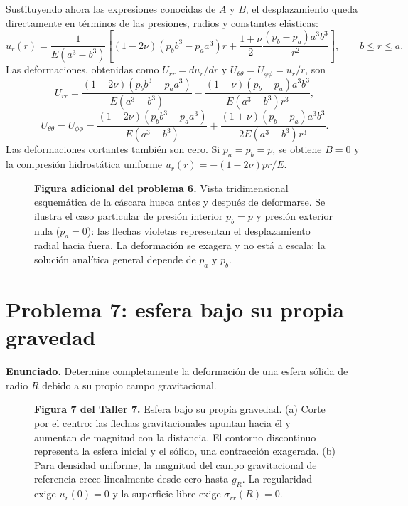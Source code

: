 \documentclass[a4paper]{article}
\begin{document}
Sustituyendo ahora las expresiones conocidas de $A$ y $B$, el desplazamiento queda directamente en términos de las presiones, radios y constantes elásticas:
\[
\boxed{
u_r(r)=\frac{1}{E(a^3-b^3)}\left[
(1-2\nu)(p_b b^3-p_a a^3)r
+\frac{1+\nu}{2}\frac{(p_b-p_a)a^3b^3}{r^2}
\right]},
\qquad b\le r\le a.
\]
Las deformaciones, obtenidas como $U_{rr}=du_r/dr$ y
$U_{\theta\theta}=U_{\phi\phi}=u_r/r$, son
\[
\boxed{
U_{rr}=\frac{(1-2\nu)(p_b b^3-p_a a^3)}{E(a^3-b^3)}
-\frac{(1+\nu)(p_b-p_a)a^3b^3}{E(a^3-b^3)r^3}},
\]
\[
\boxed{
U_{\theta\theta}=U_{\phi\phi}
=\frac{(1-2\nu)(p_b b^3-p_a a^3)}{E(a^3-b^3)}
+\frac{(1+\nu)(p_b-p_a)a^3b^3}{2E(a^3-b^3)r^3}}.
\]
Las deformaciones cortantes también son cero. Si $p_a=p_b=p$, se obtiene $B=0$ y la compresión hidrostática uniforme
$u_r(r)=-(1-2\nu)pr/E$.

\begin{figure}[H]
\centering

\par\medskip
\begin{minipage}{\textwidth}
\textbf{Figura adicional del problema 6.} Vista tridimensional esquemática de la cáscara hueca antes y después de deformarse. Se ilustra el caso particular de presión interior $p_b=p$ y presión exterior nula ($p_a=0$): las flechas violetas representan el desplazamiento radial hacia fuera. La deformación se exagera y no está a escala; la solución analítica general depende de $p_a$ y $p_b$.
\end{minipage}
\end{figure}



\section{Problema 7: esfera bajo su propia gravedad}

\textbf{Enunciado.} Determine completamente la deformación de una esfera sólida de radio $R$ debido a su propio campo gravitacional.

\begin{figure}[H]
\centering

\par\medskip
\begin{minipage}{\textwidth}
\textbf{Figura 7 del Taller 7.} Esfera bajo su propia gravedad. (a) Corte por el centro: las flechas gravitacionales apuntan hacia él y aumentan de magnitud con la distancia. El contorno discontinuo representa la esfera inicial y el sólido, una contracción exagerada. (b) Para densidad uniforme, la magnitud del campo gravitacional de referencia crece linealmente desde cero hasta $g_R$. La regularidad exige $u_r(0)=0$ y la superficie libre exige $\sigma_{rr}(R)=0$.
\end{minipage}
\end{figure}
\end{document}
